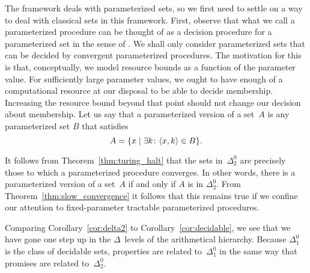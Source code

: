\begin{example}
  The \citeauthor{downey1999parameterized} framework deals with parameterized sets, so we first need to settle on a way to deal with classical sets in this framework.
  First, observe that what we call a parameterized procedure can be thought of as a decision procedure for a parameterized set in the sense of \citeauthor{downey1999parameterized}.
  We shall only consider parameterized sets that can be decided by convergent parameterized procedures.
  The motivation for this is that, conceptually, we model resource bounds as a function of the parameter value.
  For sufficiently large parameter values, we ought to have enough of a computational resource at our disposal to be able to decide membership.
  Increasing the resource bound beyond that point should not change our decision about membership.
  Let us say that a parameterized version of a set~$A$ is any parameterized set $B$ that satisfies
  \begin{equation*}
    A = \{x \;|\; \exists k\colon {\langle x, k\rangle} \in B\}.
  \end{equation*}

  It follows from Theorem~\ref{thm:turing_halt} that the sets in~$\Delta^0_2$ are precisely those to which a parameterized procedure converges.
  In other words, there is a parameterized version of a set~$A$ if and only if $A$ is in $\Delta^0_2$.
  From Theorem~\ref{thm:slow_convergence} it follows that this remains true if we confine our attention to fixed-parameter tractable parameterized procedures.
\end{example}

Comparing Corollary~\ref{cor:delta2} to Corollary~\ref{cor:decidable}, we see that we have gone one step up in the $\Delta$~levels of the arithmetical hierarchy.
Because $\Delta^0_1$ is the class of decidable sets, properties are related to~$\Delta^0_1$ in the same way that promises are related to~$\Delta^0_2$.

